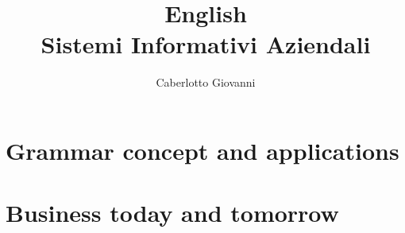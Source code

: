 \documentclass{report}
\title{\Huge{English}\\Sistemi Informativi Aziendali}
\author{\huge{Caberlotto Giovanni}}
\date{}
\begin{document}
\maketitle
\newpage%
\tableofcontents
\pagebreak

\chapter{Grammar concept and applications} %
\label{chap:Grammar concepts and applications}


\chapter{Business today and tomorrow} %
\label{chap:Business today and tomorrow}
\end{document}
